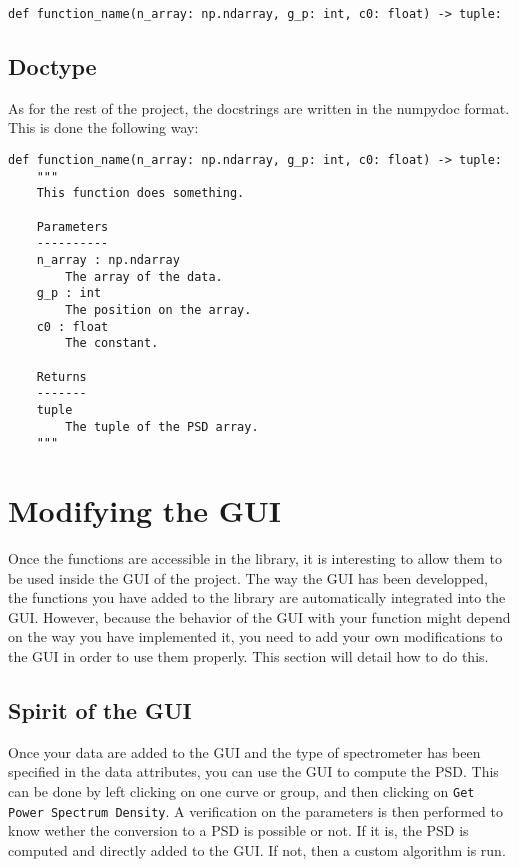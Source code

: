 \documentclass[a4paper,12pt]{article}
\begin{document}
\begin{verbatim}
def function_name(n_array: np.ndarray, g_p: int, c0: float) -> tuple:
\end{verbatim}

\subsection{Doctype}

As for the rest of the project, the docstrings are written in the numpydoc format. This is done the following way:

\begin{verbatim}
def function_name(n_array: np.ndarray, g_p: int, c0: float) -> tuple:
    """
    This function does something.

    Parameters
    ----------
    n_array : np.ndarray
        The array of the data.
    g_p : int
        The position on the array.
    c0 : float
        The constant.

    Returns
    -------
    tuple
        The tuple of the PSD array.
    """ 
\end{verbatim}

\section{Modifying the GUI}

Once the functions are accessible in the library, it is interesting to allow them to be used inside the GUI of the project. The way the GUI has been developped, the functions you have added to the library are automatically integrated into the GUI. However, because the behavior of the GUI with your function might depend on the way you have implemented it, you need to add your own modifications to the GUI in order to use them properly. This section will detail how to do this.

\subsection{Spirit of the GUI}

Once your data are added to the GUI and the type of spectrometer has been specified in the data attributes, you can use the GUI to compute the PSD. This can be done by left clicking on one curve or group, and then clicking on \texttt{Get Power Spectrum Density}. A verification on the parameters is then performed to know wether the conversion to a PSD is possible or not. If it is, the PSD is computed and directly added to the GUI. If not, then a custom algorithm is run. 
\end{document}
